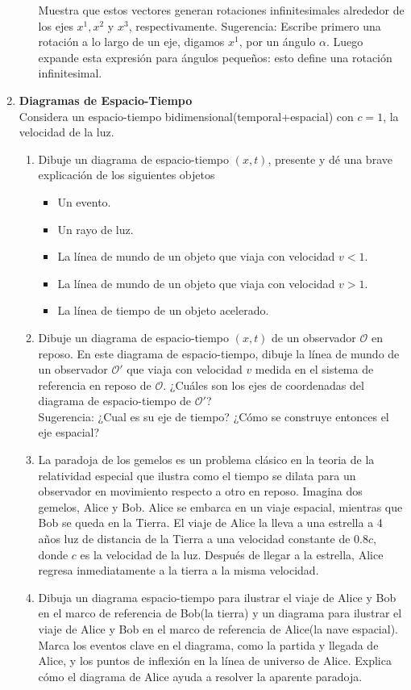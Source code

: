 \documentclass[../main]{subfiles}
\begin{document}
\begin{adjustwidth}{0pt}{-100pt}
\begin{enumerate}
\begin{enumerate}
        Muestra que estos vectores generan rotaciones infinitesimales alrededor de los ejes $x^1, x^2$ y $x^3$, respectivamente. Sugerencia: Escribe primero una rotación a lo largo de un eje, digamos $x^1$, por un ángulo $\alpha$. Luego expande esta expresión para ángulos pequeños: esto define una rotación infinitesimal.
    \end{enumerate}
    \item \textbf{Diagramas de Espacio-Tiempo}\\
    Considera un espacio-tiempo bidimensional(temporal+espacial) con $c=1$, la velocidad de la luz.
    \begin{enumerate}
        \item Dibuje un diagrama de espacio-tiempo $(x, t)$, presente y dé una brave explicación de los siguientes objetos
        \begin{itemize}
            \item Un evento.
            \item Un rayo de luz.
            \item La línea de mundo de un objeto que viaja con velocidad $v<1$.
            \item La línea de mundo de un objeto que viaja con velocidad $v>1$.
            \item La línea de tiempo de un objeto acelerado.
        \end{itemize}
        \item Dibuje un diagrama de espacio-tiempo $(x, t)$ de un observador $\mathcal{O}$ en reposo. En este diagrama de espacio-tiempo, dibuje la línea de mundo de un observador $\mathcal{O}'$ que viaja con velocidad $v$ medida en el sistema de referencia en reposo de $\mathcal{O}$. ¿Cuáles son los ejes de coordenadas del diagrama de espacio-tiempo de $\mathcal{O}'$?\\
        Sugerencia: ¿Cual es su eje de tiempo? ¿Cómo se construye entonces el eje espacial?
        \item La paradoja de los gemelos es un problema clásico en la teoria de la relatividad especial que ilustra como el tiempo se dilata para un observador en movimiento respecto a otro en reposo. Imagina dos gemelos, Alice y Bob. Alice se embarca en un viaje espacial, mientras que Bob se queda en la Tierra. El viaje de Alice la lleva a una estrella a 4 años luz de distancia de la Tierra a una velocidad constante de $0.8c$, donde $c$ es la velocidad de la luz. Después de llegar a la estrella, Alice regresa inmediatamente a la tierra a la misma velocidad.
        \item Dibuja un diagrama espacio-tiempo para ilustrar el viaje de Alice y Bob en el marco de referencia de Bob(la tierra) y un diagrama para ilustrar el viaje de Alice y Bob en el marco de referencia de Alice(la nave espacial). Marca los eventos clave en el diagrama, como la partida y llegada de Alice, y los puntos de inflexión en la línea de universo de Alice. Explica cómo el diagrama de Alice ayuda a resolver la aparente paradoja.

\end{enumerate}
\end{enumerate}
\end{adjustwidth}
\end{document}
